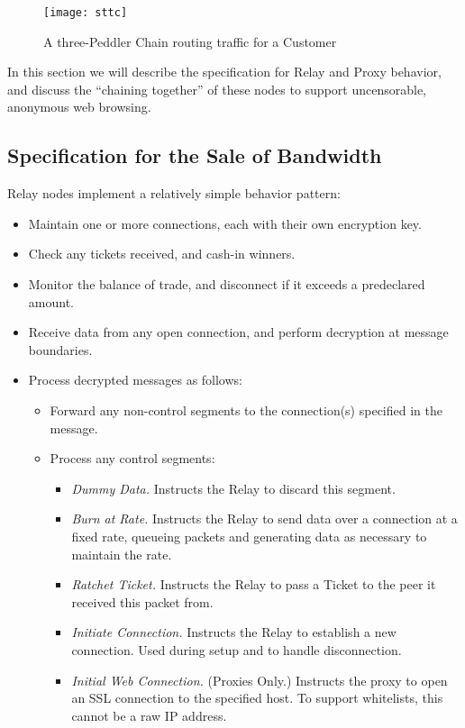 
\begin{figure}[htbp]
  \centering
  \texttt{[image: sttc]}
  \caption{A three-Peddler Chain routing traffic for a Customer}
\end{figure}

In this section we will describe the specification for Relay and Proxy
behavior, and discuss the ``chaining together'' of these nodes to
support uncensorable, anonymous web browsing.

\subsection*{Specification for the Sale of Bandwidth}

Relay nodes implement a relatively simple behavior pattern:

\begin{itemize}
  \item Maintain one or more connections, each with their own encryption key.
  \item Check any tickets received, and cash-in winners.
  \item Monitor the balance of trade, and disconnect if it exceeds a
    predeclared amount.
  \item Receive data from any open connection, and perform decryption at
    message boundaries.
  \item Process decrypted messages as follows:
    \begin{itemize}
      \item Forward any non-control segments to the connection(s)
        specified in the message.
      \item Process any control segments:
        \begin{itemize}
          \item \emph{Dummy Data.} Instructs the Relay to discard this segment.
          \item \emph{Burn at Rate.} Instructs the Relay to send data over a
            connection at a fixed rate, queueing packets and generating data
            as necessary to maintain the rate.
          \item \emph{Ratchet Ticket.} Instructs the Relay to pass a Ticket to
            the peer it received this packet from.
          \item \emph{Initiate Connection.} Instructs the Relay to establish a
            new connection. Used during setup and to handle disconnection.
          \item \emph{Initial Web Connection.} (Proxies Only.) Instructs the
            proxy to open an SSL connection to the specified host. To
            support whitelists, this cannot be a raw IP address.
        \end{itemize}
    \end{itemize}
\end{itemize}

